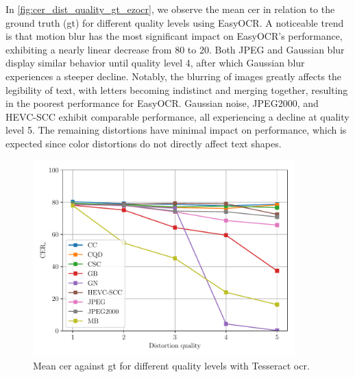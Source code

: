 In \autoref{fig:cer_dist_quality_gt_ezocr}, we observe the mean \gls{cer} in relation to the ground truth (\gls{gt}) for different quality levels using EasyOCR.
A noticeable trend is that motion blur has the most significant impact on EasyOCR's performance, exhibiting a nearly linear decrease from 80 to 20.
Both JPEG and Gaussian blur display similar behavior until quality level 4, after which Gaussian blur experiences a steeper decline.
Notably, the blurring of images greatly affects the legibility of text, with letters becoming indistinct and merging together, resulting in the poorest performance for EasyOCR.
Gaussian noise, JPEG2000, and HEVC-SCC exhibit comparable performance, all experiencing a decline at quality level 5.
The remaining distortions have minimal impact on performance, which is expected since color distortions do not directly affect text shapes.

\begin{figure}[h]
\centering
    \includegraphics[width=0.9\textwidth]{../../images/analyze/cer_dist_quality_gt_tess.pdf}
    \caption{Mean \gls{cer} against \gls{gt} for different quality levels with Tesseract \gls{ocr}.}
\label{fig:cer_dist_quality_gt_tesseract}
\end{figure}

